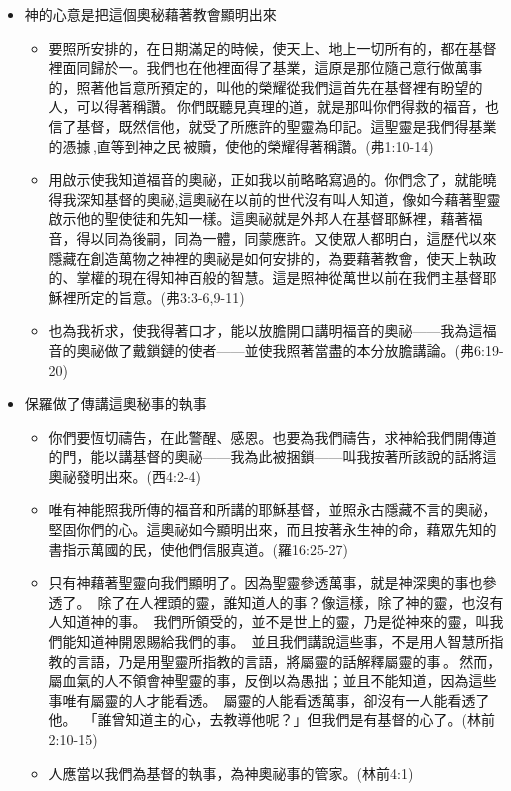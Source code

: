 \begin{itemize}
\item 神的心意是把這個奧秘藉著教會顯明出來
\begin{itemize}
\itemsep-.25em 
\item 要照所安排的，在日期滿足的時候，使天上、地上一切所有的，都在基督裡面同歸於一。我們也在他裡面得了基業，這原是那位隨己意行做萬事的，照著他旨意所預定的，叫他的榮耀從我們這首先在基督裡有盼望的人，可以得著稱讚。 你們既聽見真理的道，就是那叫你們得救的福音，也信了基督，既然信他，就受了所應許的聖靈為印記。這聖靈是我們得基業的憑據 ,直等到神之民 被贖，使他的榮耀得著稱讚。(弗1:10-14)
\item 用啟示使我知道福音的奧祕，正如我以前略略寫過的。你們念了，就能曉得我深知基督的奧祕,這奧祕在以前的世代沒有叫人知道，像如今藉著聖靈啟示他的聖使徒和先知一樣。這奧祕就是外邦人在基督耶穌裡，藉著福音，得以同為後嗣，同為一體，同蒙應許。又使眾人都明白，這歷代以來隱藏在創造萬物之神裡的奧祕是如何安排的，為要藉著教會，使天上執政的、掌權的現在得知神百般的智慧。這是照神從萬世以前在我們主基督耶穌裡所定的旨意。(弗3:3-6,9-11)
\item 也為我祈求，使我得著口才，能以放膽開口講明福音的奧祕——我為這福音的奧祕做了戴鎖鏈的使者——並使我照著當盡的本分放膽講論。(弗6:19-20)
\end{itemize}
\item 保羅做了傳講這奧秘事的執事
\begin{itemize}
\itemsep-.34em
\item 你們要恆切禱告，在此警醒、感恩。也要為我們禱告，求神給我們開傳道的門，能以講基督的奧祕——我為此被捆鎖——叫我按著所該說的話將這奧祕發明出來。(西4:2-4) 
\item 唯有神能照我所傳的福音和所講的耶穌基督，並照永古隱藏不言的奧祕，堅固你們的心。這奧祕如今顯明出來，而且按著永生神的命，藉眾先知的書指示萬國的民，使他們信服真道。(羅16:25-27)


\item 只有神藉著聖靈向我們顯明了。因為聖靈參透萬事，就是神深奧的事也參透了。  除了在人裡頭的靈，誰知道人的事？像這樣，除了神的靈，也沒有人知道神的事。  我們所領受的，並不是世上的靈，乃是從神來的靈，叫我們能知道神開恩賜給我們的事。  並且我們講說這些事，不是用人智慧所指教的言語，乃是用聖靈所指教的言語，將屬靈的話解釋屬靈的事 。 然而，屬血氣的人不領會神聖靈的事，反倒以為愚拙；並且不能知道，因為這些事唯有屬靈的人才能看透。  屬靈的人能看透萬事，卻沒有一人能看透了他。  「誰曾知道主的心，去教導他呢？」但我們是有基督的心了。(林前2:10-15)
\item 人應當以我們為基督的執事，為神奧祕事的管家。(林前4:1)


\end{itemize}
\end{itemize}

